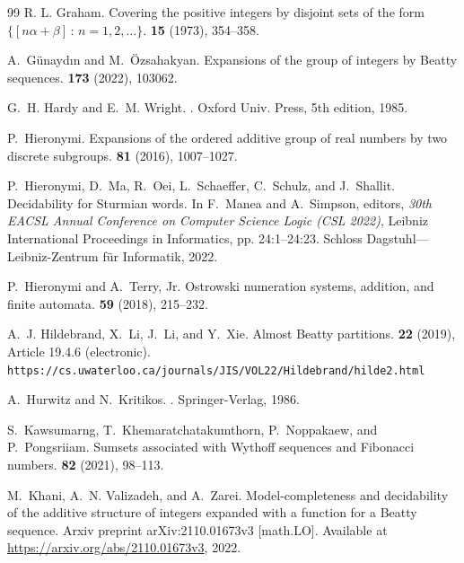 \documentclass[12pt,reqno]{article}
\begin{document}
\begin{thebibliography}{99}
R. L. Graham.
\newblock Covering the positive integers by disjoint sets of the form
$\{ [n \alpha + \beta] \, : \, n = 1,2, \ldots\}$.
 {\bf 15} (1973), 354--358.

A.~G{\"u}nayd{\i}n and M.~{\"O}zsahakyan.
\newblock Expansions of the group of integers by {Beatty} sequences.
 {\bf 173} (2022), 103062.

G.~H. Hardy and E.~M. Wright.
.
\newblock Oxford Univ. Press, 5th edition, 1985.

P.~Hieronymi.
\newblock Expansions of the ordered additive group of real numbers by two
  discrete subgroups.
 {\bf 81} (2016), 1007--1027.

P.~Hieronymi, D.~Ma, R.~Oei, L.~Schaeffer, C.~Schulz, and J.~Shallit.
\newblock Decidability for {Sturmian} words.
\newblock In F.~Manea and A.~Simpson, editors, {\em 30th EACSL Annual
  Conference on Computer Science Logic (CSL 2022)}, Leibniz International
  Proceedings in Informatics, pp.  24:1--24:23. Schloss
  Dagstuhl---Leibniz-Zentrum f{\"u}r Informatik, 2022.

P.~Hieronymi and A.~Terry, Jr.
\newblock Ostrowski numeration systems, addition, and finite automata.
 {\bf 59} (2018), 215--232.

A.~J. Hildebrand, X.~Li, J.~Li, and Y.~Xie.
\newblock Almost {Beatty} partitions.
 {\bf 22} (2019), Article 19.4.6
  (electronic).
\newblock
  \verb!https://cs.uwaterloo.ca/journals/JIS/VOL22/Hildebrand/hilde2.html!

A.~Hurwitz and N.~Kritikos.
.
\newblock Springer-Verlag, 1986.

S.~Kawsumarng, T.~Khemaratchatakumthorn, P.~Noppakaew, and P.~Pongsriiam.
\newblock Sumsets associated with {Wythoff} sequences and {Fibonacci} numbers.
 {\bf 82} (2021), 98--113.

M.~Khani, A.~N. Valizadeh, and A.~Zarei.
\newblock Model-completeness and decidability of the additive structure of
  integers expanded with a function for a {Beatty} sequence.
\newblock Arxiv preprint arXiv:2110.01673v3 [math.LO]. Available at
  \url{https://arxiv.org/abs/2110.01673v3}, 2022.


\end{thebibliography}
\end{document}
